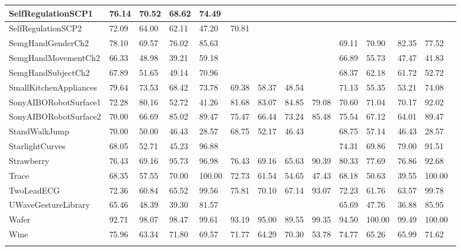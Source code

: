 \begin{landscape}
\begin{longtable}{|l|llll|llll|llll|}
      SelfRegulationSCP1 & 76.14 & 70.52 & 68.62 & 74.49 &   &   &   &   &   &   &   &   \\ \hline
      SelfRegulationSCP2 & 72.09 & 64.00 & 62.11 & 47.20 & 70.81 &   &   &   &   &   &   &   \\ \hline
      SemgHandGenderCh2 & 78.10 & 69.57 & 76.02 & 85.63 &   &   &   &   & 69.11 & 70.90 & 82.35 & 77.52 \\ \hline
      SemgHandMovementCh2 & 66.33 & 48.98 & 39.21 & 59.18 &   &   &   &   & 66.89 & 55.73 & 47.47 & 41.83 \\ \hline
      SemgHandSubjectCh2 & 67.89 & 51.65 & 49.14 & 70.96 &   &   &   &   & 68.37 & 62.18 & 61.72 & 52.72 \\ \hline
      SmallKitchenAppliances & 79.64 & 73.53 & 68.42 & 73.78 & 69.38 & 58.37 & 48.54 &   & 71.13 & 55.35 & 53.21 & 74.08 \\ \hline
      SonyAIBORobotSurface1 & 72.28 & 80.16 & 52.72 & 41.26 & 81.68 & 83.07 & 84.85 & 79.08 & 70.60 & 71.04 & 70.17 & 92.02 \\ \hline
      SonyAIBORobotSurface2 & 70.00 & 66.69 & 85.02 & 89.47 & 75.47 & 66.44 & 73.24 & 85.48 & 75.54 & 67.12 & 64.01 & 89.47 \\ \hline
      StandWalkJump & 70.00 & 50.00 & 46.43 & 28.57 & 68.75 & 52.17 & 46.43 &   & 68.75 & 57.14 & 46.43 & 28.57 \\ \hline
      StarlightCurves & 68.05 & 52.71 & 45.23 & 96.88 &   &   &   &   & 74.31 & 69.86 & 79.00 & 91.51 \\ \hline
      Strawberry & 76.43 & 69.16 & 95.73 & 96.98 & 76.43 & 69.16 & 65.63 & 90.39 & 80.33 & 77.69 & 76.86 & 92.68 \\ \hline
      Trace & 68.35 & 57.55 & 70.00 & 100.00 & 72.73 & 61.54 & 54.65 & 47.43 & 68.18 & 50.63 & 39.55 & 100.00 \\ \hline
      TwoLeadECG & 72.36 & 60.84 & 65.52 & 99.56 & 75.81 & 70.10 & 67.14 & 93.07 & 72.23 & 61.76 & 63.57 & 99.78 \\ \hline
      UWaveGestureLibrary & 65.46 & 48.39 & 39.30 & 81.57 &   &   &   &   & 65.69 & 47.76 & 36.88 & 85.95 \\ \hline
      Wafer & 92.71 & 98.07 & 98.47 & 99.61 & 93.19 & 95.00 & 89.55 & 99.35 & 94.50 & 100.00 & 99.49 & 100.00 \\ \hline
      Wine & 75.96 & 63.34 & 71.80 & 69.57 & 71.77 & 64.29 & 70.30 & 53.78 & 74.77 & 65.26 & 65.99 & 71.62 \\ \hline
    \label{tab:longresults}
    \end{longtable}
\end{landscape}

